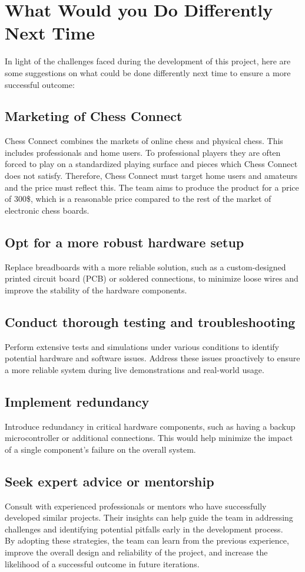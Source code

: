\documentclass{article}
\begin{document}
\section{What Would you Do Differently Next Time}

In light of the challenges faced during the development of this project, here are some suggestions on what could be done differently next time to ensure a more successful outcome:

\subsection{Marketing of Chess Connect}
Chess Connect combines the markets of online chess and physical chess. This includes professionals
and home users. To professional players they are often forced to play on a standardized playing
surface and pieces which Chess Connect does not satisfy. Therefore, Chess Connect must target 
home users and amateurs and the price must reflect this. The team aims to produce the product 
for a price of 300\$, which is a reasonable price compared to the rest of the market of electronic
chess boards. 

\subsection{Opt for a more robust hardware setup}
Replace breadboards with a more reliable solution, such as a custom-designed printed circuit board (PCB) or soldered connections, to minimize loose wires and improve the stability of the hardware components.

\subsection{Conduct thorough testing and troubleshooting}
Perform extensive tests and simulations under various conditions to identify potential hardware and software issues. Address these issues proactively to ensure a more reliable system during live demonstrations and real-world usage.

\subsection{Implement redundancy}
Introduce redundancy in critical hardware components, such as having a backup microcontroller or additional connections. This would help minimize the impact of a single component's failure on the overall system.

\subsection{Seek expert advice or mentorship}
Consult with experienced professionals or mentors who have successfully developed similar projects. Their insights can help guide the team in addressing challenges and identifying potential pitfalls early in the development process. \\ 

By adopting these strategies, the team can learn from the previous experience, improve the overall design and reliability of the project, and increase the likelihood of a successful outcome in future iterations.
\end{document}
